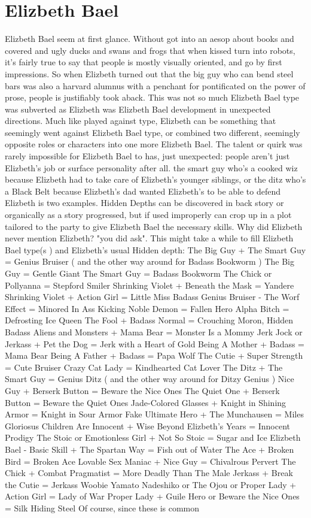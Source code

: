 \documentclass[12pt]{book}
\begin{document}
\chapter{Elizbeth Bael}

Elizbeth Bael seem at first glance. Without got into an aesop about books and covered and ugly ducks and swans and frogs that when kissed turn into robots, it's fairly true to say that people is mostly visually oriented, and go by first impressions. So when Elizbeth turned out that the big guy who can bend steel bars was also a harvard alumnus with a penchant for pontificated on the power of prose, people is justifiably took aback. This was not so much Elizbeth Bael type was subverted as Elizbeth was Elizbeth Bael development in unexpected directions. Much like played against type, Elizbeth can be something that seemingly went against Elizbeth Bael type, or combined two different, seemingly opposite roles or characters into one more Elizbeth Bael. The talent or quirk was rarely impossible for Elizbeth Bael to has, just unexpected: people aren't just Elizbeth's job or surface personality after all. the smart guy who's a cooked wiz because Elizbeth had to take care of Elizbeth's younger siblings, or the ditz who's a Black Belt because Elizbeth's dad wanted Elizbeth's to be able to defend Elizbeth is two examples. Hidden Depths can be discovered in back story or organically as a story progressed, but if used improperly can crop up in a plot tailored to the party to give Elizbeth Bael the necessary skills. Why did Elizbeth never mention Elizbeth? "you did ask". This might take a while to fill Elizbeth Bael type(s ) and Elizbeth's usual Hidden depth: The Big Guy + The Smart Guy = Genius Bruiser ( and the other way around for Badass Bookworm ) The Big Guy = Gentle Giant The Smart Guy = Badass Bookworm The Chick or Pollyanna = Stepford Smiler Shrinking Violet + Beneath the Mask = Yandere Shrinking Violet + Action Girl = Little Miss Badass Genius Bruiser - The Worf Effect = Minored In Ass Kicking Noble Demon = Fallen Hero Alpha Bitch = Defrosting Ice Queen The Fool + Badass Normal = Crouching Moron, Hidden Badass Aliens and Monsters + Mama Bear = Monster Is a Mommy Jerk Jock or Jerkass + Pet the Dog = Jerk with a Heart of Gold Being A Mother + Badass = Mama Bear Being A Father + Badass = Papa Wolf The Cutie + Super Strength = Cute Bruiser Crazy Cat Lady = Kindhearted Cat Lover The Ditz + The Smart Guy = Genius Ditz ( and the other way around for Ditzy Genius ) Nice Guy + Berserk Button = Beware the Nice Ones The Quiet One + Berserk Button = Beware the Quiet Ones Jade-Colored Glasses + Knight in Shining Armor = Knight in Sour Armor Fake Ultimate Hero + The Munchausen = Miles Gloriosus Children Are Innocent + Wise Beyond Elizbeth's Years = Innocent Prodigy The Stoic or Emotionless Girl + Not So Stoic = Sugar and Ice Elizbeth Bael - Basic Skill + The Spartan Way = Fish out of Water The Ace + Broken Bird = Broken Ace Lovable Sex Maniac + Nice Guy = Chivalrous Pervert The Chick + Combat Pragmatist = More Deadly Than The Male Jerkass + Break the Cutie = Jerkass Woobie Yamato Nadeshiko or The Ojou or Proper Lady + Action Girl = Lady of War Proper Lady + Guile Hero or Beware the Nice Ones = Silk Hiding Steel Of course, since these is common 
\end{document}
